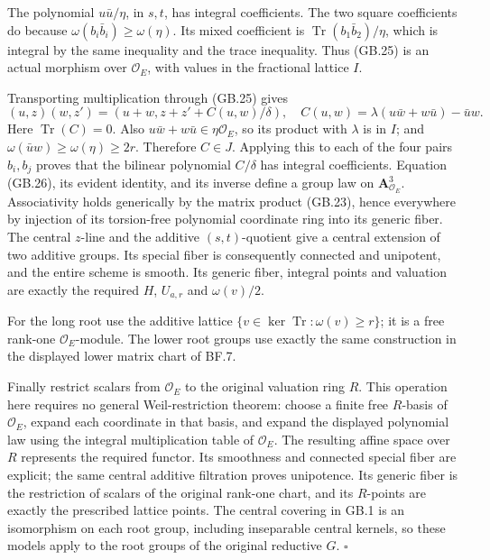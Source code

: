 \documentclass[
  11pt,
]{article}
\begin{document}
The polynomial \(u\bar u/\eta\), in \(s,t\), has integral coefficients.
The two square coefficients do because
\(\omega(b_i\bar b_i)\geq\omega(\eta)\). Its mixed coefficient is
\(\operatorname {Tr}(b_1\bar b_2)/\eta\), which is integral by the same
inequality and the trace inequality. Thus (GB.25) is an actual morphism
over \(\mathcal O_E\), with values in the fractional lattice \(I\).

Transporting multiplication through (GB.25) gives \[
 (u,z)(w,z')=(u+w,z+z'+C(u,w)/\delta),\quad
 C(u,w)=\lambda(u\bar w+w\bar u)-\bar u w.
 \tag{GB.26}
\] Here \(\operatorname {Tr}(C)=0\). Also
\(u\bar w+w\bar u\in\eta\mathcal O_E\), so its product with \(\lambda\)
is in \(I\); and \(\omega(\bar u w)\geq\omega(\eta)\geq2r\). Therefore
\(C\in J\). Applying this to each of the four pairs \(b_i,b_j\) proves
that the bilinear polynomial \(C/\delta\) has integral coefficients.
Equation (GB.26), its evident identity, and its inverse define a group
law on \(\mathbf A^3_{\mathcal O_E}\). Associativity holds generically
by the matrix product (GB.23), hence everywhere by injection of its
torsion-free polynomial coordinate ring into its generic fiber. The
central \(z\)-line and the additive \((s,t)\)-quotient give a central
extension of two additive groups. Its special fiber is consequently
connected and unipotent, and the entire scheme is smooth. Its generic
fiber, integral points and valuation are exactly the required \(H\),
\(U_{a,r}\) and \(\omega(v)/2\).

For the long root use the additive lattice
\(\{v\in\ker\operatorname {Tr}:\omega(v)\geq r\}\); it is a free
rank-one \(\mathcal O_E\)-module. The lower root groups use exactly the
same construction in the displayed lower matrix chart of BF.7.

Finally restrict scalars from \(\mathcal O_E\) to the original valuation
ring \(R\). This operation here requires no general Weil-restriction
theorem: choose a finite free \(R\)-basis of \(\mathcal O_E\), expand
each coordinate in that basis, and expand the displayed polynomial law
using the integral multiplication table of \(\mathcal O_E\). The
resulting affine space over \(R\) represents the required functor. Its
smoothness and connected special fiber are explicit; the same central
additive filtration proves unipotence. Its generic fiber is the
restriction of scalars of the original rank-one chart, and its
\(R\)-points are exactly the prescribed lattice points. The central
covering in GB.1 is an isomorphism on each root group, including
inseparable central kernels, so these models apply to the root groups of
the original reductive \(G\). \(\square\)
\end{document}
